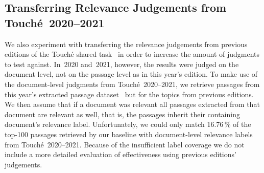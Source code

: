 \subsection{Transferring Relevance Judgements from Touché~2020--2021}
\label{transfer-relevance-judgements}

We also experiment with transferring the relevance judgements from previous editions of the Touché shared task~\cite{BondarenkoFBGAPBSWPH2020,BondarenkoGFBAPBSWPH2021} in order to increase the amount of judgments to test against.
In~2020 and~2021, however, the results were judged on the document level, not on the passage level as in this year's edition.
To make use of the document-level judgments from Touché~2020--2021, we retrieve passages from this year's extracted passage dataset~\cite{BondarenkoFKSGBPBSWPH2022} but for the topics from previous editions.
We then assume that if a document was relevant all passages extracted from that document are relevant as well, that is, the passages inherit their containing document's relevance label.
Unfortunately, we could only match 16.76\,\% of the top-100 passages retrieved by our baseline with document-level relevance labels from Touché~2020--2021.
Because of the insufficient label coverage we do not include a more detailed evaluation of effectiveness using previous editions' judgements.
